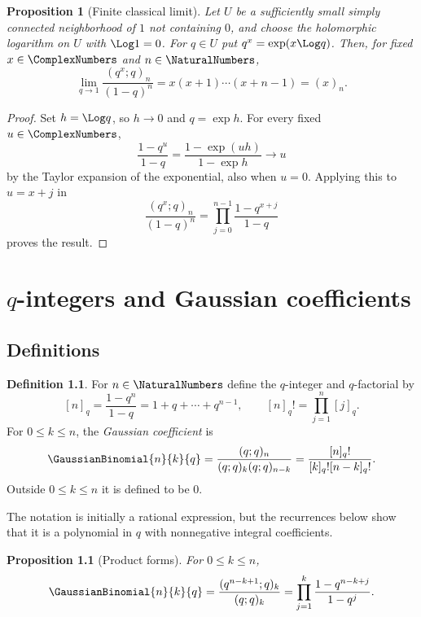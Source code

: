 \documentclass[11pt,a4paper,oneside,openany]{book}
\newtheorem{proposition}[proposition]{Proposition}
\theoremstyle{definition}
\newtheorem{definition}[definition]{Definition}
\theoremstyle{remark}
\begin{document}
\begin{proposition}[Finite classical limit]\label{prop:classical-poch-limit}
Let $U$ be a sufficiently small simply connected neighborhood of $1$ not
containing $0$, and choose the holomorphic logarithm on $U$ with
$\Log 1=0$.  For $q\in U$ put $q^x=\exp(x\Log q)$.  Then, for fixed
$x\in\ComplexNumbers$ and $n\in\NaturalNumbers$,
\[
 \lim_{q\to1}\frac{(q^x;q)_n}{(1-q)^n}
 =x(x+1)\cdots(x+n-1)=(x)_n.
\]
\end{proposition}

\begin{proof}
Set $h=\Log q$, so $h\to0$ and $q=\exp h$.  For every fixed
$u\in\ComplexNumbers$,
\[
 \frac{1-q^u}{1-q}=\frac{1-\exp(uh)}{1-\exp h}\longrightarrow u
\]
by the Taylor expansion of the exponential, also when $u=0$.  Applying this
to $u=x+j$ in
\[
 \frac{(q^x;q)_n}{(1-q)^n}
 =\prod_{j=0}^{n-1}\frac{1-q^{x+j}}{1-q}
\]
proves the result.
\end{proof}

\chapter{\texorpdfstring{$q$}{q}-integers and Gaussian coefficients}\label{chap:gaussian}

\section{Definitions}

\begin{definition}\label{qg:def-gaussian-coefficient}
For $n\in\NaturalNumbers$ define the $q$-integer and $q$-factorial by
\[
 [n]_q=\frac{1-q^n}{1-q}=1+q+\cdots+q^{n-1},
 \qquad
 [n]_q!=\prod_{j=1}^{n}[j]_q.
\]
For $0\le k\le n$, the \emph{Gaussian coefficient} is
\[
 \GaussianBinomial{n}{k}{q}
 =\frac{(q;q)_n}{(q;q)_k(q;q)_{n-k}}
 =\frac{[n]_q!}{[k]_q![n-k]_q!}.
\]
Outside $0\le k\le n$ it is defined to be $0$.
\end{definition}

The notation is initially a rational expression, but the recurrences below show that it is a polynomial in $q$ with nonnegative integral coefficients.

\begin{proposition}[Product forms]\label{prop:qbinom-products}
For $0\le k\le n$,
\[
 \GaussianBinomial{n}{k}{q}
 =\frac{(q^{n-k+1};q)_k}{(q;q)_k}
 =\prod_{j=1}^{k}\frac{1-q^{n-k+j}}{1-q^j}.
\]
\end{proposition}
\end{document}
